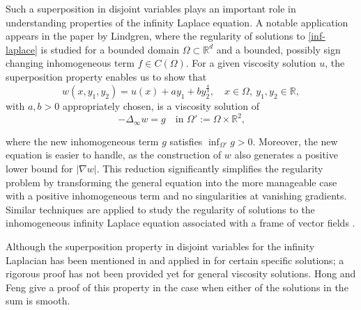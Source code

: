 \documentclass[12pt, reqno]{amsart}
\newcommand{\R}{\mathbb{R}}
\newcommand{\red}[1]{\textcolor{red}{#1}}
\newcommand{\blue}[1]{\textcolor{blue}{#1}}
\def\R{{\mathbb R}}
\begin{document}
Such a superposition in disjoint variables plays an important role in understanding properties of the infinity Laplace equation. A notable application appears in the paper \cite{Lin14} by Lindgren, %
where the regularity of solutions to \eqref{inf-laplace} is studied for a bounded domain $\Omega\subset \R^d$ and a bounded, possibly sign changing inhomogeneous term $f\in C(\Omega)$. For a given viscosity solution $u$,  the superposition property enables us to show that 
\[
w(x, y_1, y_2)=u(x)+a y_1+by_2^{\frac{4}{3}}, \quad x\in \Omega,\ y_1, y_2\in \R,
\]
with $a, b>0$ appropriately chosen, is a viscosity solution of 
\[
-\Delta_\infty w = g \quad \text{in $\Omega':=\Omega\times \R^2$,}
\]
\par\noindent  where the new inhomogeneous term $g$ satisfies $\inf_{\Omega'} g>0$. Moreover, the new equation is easier to handle, as the construction of $w$ also generates a positive lower bound for $|\nabla w|$. 
This reduction significantly simplifies the regularity problem by transforming the general equation into the more manageable case with a positive inhomogeneous term and no singularities at vanishing gradients. Similar techniques are applied to study the regularity of solutions to the inhomogeneous infinity Laplace equation associated with a frame of vector fields \cite{FM}. 



Although the superposition property in disjoint variables for
the infinity Laplacian has been mentioned in \cite{LindBook} and applied in \cite{Lin14} for certain specific solutions; a rigorous proof has not been provided yet for general viscosity solutions. Hong and Feng \cite{HF} give a proof of this property in the case when either of the solutions in the sum is smooth. 
\end{document}

